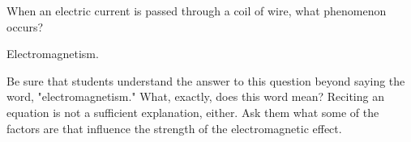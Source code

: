 

When an electric current is passed through a coil of wire, what phenomenon occurs?







Electromagnetism.







Be sure that students understand the answer to this question beyond saying the word, "electromagnetism."  What, exactly, does this word mean?  Reciting an equation is not a sufficient explanation, either.  Ask them what some of the factors are that influence the strength of the electromagnetic effect.




